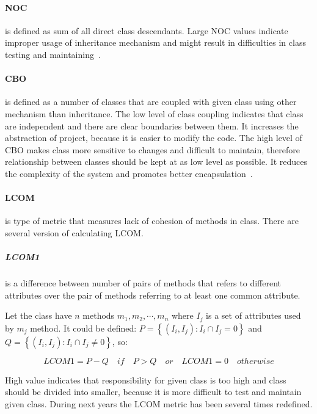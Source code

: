 \paragraph{\ac{NOC}} is defined as sum of all direct class descendants. Large \ac{NOC} values indicate improper usage of inheritance mechanism and might result in difficulties in class testing and maintaining~\cite{nasa}.  

\paragraph{\ac{CBO}} is defined as a number of classes that are coupled with given class using other mechanism than inheritance. The low level of class coupling indicates that class are independent and there are clear boundaries between them. It increases the abstraction of project, because it is easier to modify the code. The high level of \ac{CBO} makes class more sensitive to changes and difficult to maintain, therefore relationship between classes should be kept at as low level as possible. It reduces the complexity of the system and promotes better encapsulation~\cite{nasa}. 

\paragraph{\ac{LCOM}} is type of metric that measures lack of cohesion of methods in class. There are several version of calculating \ac{LCOM}.

\subparagraph*{LCOM1} is a difference between number of pairs of methods that refers to different attributes over the pair of methods referring to at least one common attribute. 

Let the class have $n$ methods $m_{1}, m_{2}, \cdots, m_{n}$ where $I_{j}$ is a set of attributes used by $m_{j}$ method. It could be defined: $P=\left\{ \left( { I }_{ i },{ I }_{ j } \right) :{ I }_{ i }\cap { I }_{ j }=0 \right\}$ and $Q=\left\{ \left( { I }_{ i },{ I }_{ j } \right) :{ I }_{ i }\cap { I }_{ j }\neq 0 \right\}$, so: 

\begin{equation}
LCOM1=P-Q\quad if\quad P>Q\quad or\quad LCOM1=0\quad otherwise
\end{equation}

High value indicates that responsibility for given class is too high and class should be divided into smaller, because it is more difficult to test and maintain given class. During next years the \ac{LCOM} metric has been several times redefined. 

